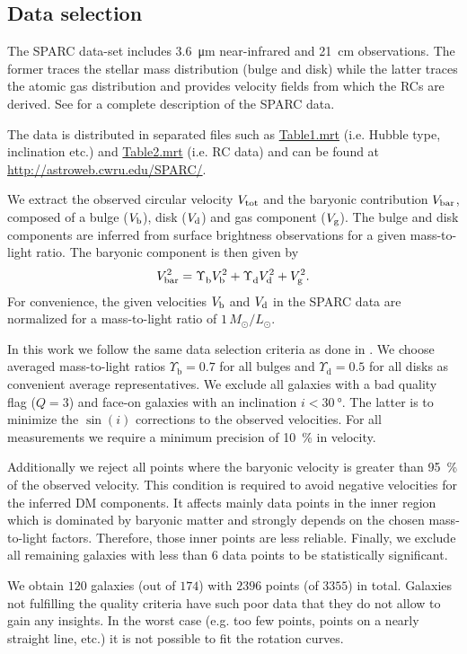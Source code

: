 \subsection{Data selection}
\label{sec:data}

The SPARC data-set includes \SI{3.6}{\micro\meter} near-infrared and \SI{21}{\centi\meter} observations. The former traces the stellar mass distribution (bulge and disk) while the latter traces the atomic gas distribution and provides velocity fields from which the RCs are derived. See \citet{2016AJ....152..157L} for a complete description of the SPARC data.

The data is distributed in separated files such as \href{http://astroweb.cwru.edu/SPARC/SPARC_Lelli2016c.mrt}{Table1.mrt} (i.e. Hubble type, inclination etc.) and \href{http://astroweb.cwru.edu/SPARC/MassModels_Lelli2016c.mrt}{Table2.mrt} (i.e. RC data) and can be found at \url{http://astroweb.cwru.edu/SPARC/}.

We extract the observed circular velocity $V_\mathrm{tot}$ and the baryonic contribution $V_\mathrm{bar}$, composed of a bulge ($V_\mathrm{b}$), disk ($V_\mathrm{d}$) and gas component ($V_\mathrm{g}$). The bulge and disk components are inferred from surface brightness observations for a given mass-to-light ratio. The baryonic component is then given by 
%
\begin{equation}
	\label{eqn:baryonic-sum}
	\SYMvbar^2 = \Upsilon_\mathrm{b}^{\phantom{2}} \SYMvbulge^2 + \Upsilon_\mathrm{d}^{\phantom{2}} \SYMvdisk^2 + \SYMvgas^2.
\end{equation} 
%
For convenience, the given velocities $V_\mathrm{b}$ and $V_\mathrm{d}$ in the SPARC data are normalized for a mass-to-light ratio of $1\,M_\odot/L_\odot$.

In this work we follow the same data selection criteria as done in \citet{2016PhRvL.117t1101M}. We choose averaged mass-to-light ratios $\Upsilon_\mathrm{b} = 0.7$ for all bulges and $\Upsilon_\mathrm{d} = 0.5$ for all disks as convenient average representatives. We exclude all galaxies with a bad quality flag ($Q=3$) and face-on galaxies with an inclination $i < \SI{30}{\degree}$. The latter is to minimize the $\sin(i)$ corrections to the observed velocities. For all measurements we require a minimum precision of \SI{10}{\percent} in velocity.

Additionally we reject all points where the baryonic velocity is greater than \SI{95}{\percent} of the observed velocity. This condition is required to avoid negative velocities for the inferred DM components. It affects mainly data points in the inner region which is dominated by baryonic matter and strongly depends on the chosen mass-to-light factors. Therefore, those inner points are less reliable. Finally, we exclude all remaining galaxies with less than 6 data points to be statistically significant.

We obtain $120$ galaxies (out of $174$) with $2396$ points (of $3355$) in total. Galaxies not fulfilling the quality criteria have such poor data that they do not allow to gain any insights. In the worst case (e.g. too few points, points on a nearly straight line, etc.) it is not possible to fit the rotation curves.
